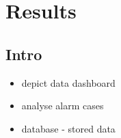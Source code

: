 \chapter{Results}
\label{chap4}

\section{Intro}
{
\begin{itemize}
\item depict data  dashboard
\item analyse alarm cases
\item database - stored data
\end{itemize}
}

